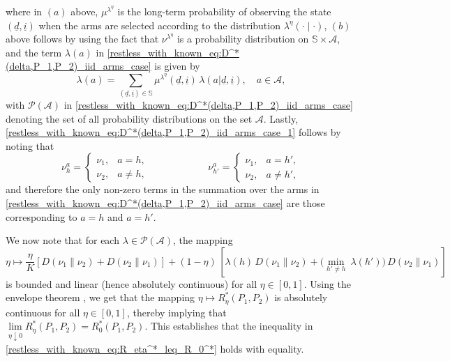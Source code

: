 { \color{black} where in $(a)$ above, $\mu^{\lambda^\eta}$ is the long-term probability of observing the state $(\underline{d},\underline{i})$ when the arms are selected according to the distribution $\lambda^\eta(\cdot\mid \cdot)$, $(b)$ above follows by using the fact that $\nu^{\lambda^\eta}$ is a probability distribution on $\mathbb{S}\times \mathcal{A}$, and the term $\lambda(a)$ in \eqref{restless_with_known_eq:D^*(delta,P_1,P_2)_iid_arms_case} is given by $$\lambda(a)=\sum\limits_{(\underline{d},\underline{i})\in\mathbb{S}}\mu^{\lambda^\eta}(\underline{d},\underline{i})\,\lambda(a|\underline{d},\underline{i}),\quad a\in\mathcal{A},$$ with $\mathcal{P}(\mathcal{A})$ in \eqref{restless_with_known_eq:D^*(delta,P_1,P_2)_iid_arms_case} denoting the set of all probability distributions on the set $\mathcal{A}$. Lastly, \eqref{restless_with_known_eq:D^*(delta,P_1,P_2)_iid_arms_case_1} follows by noting that
\begin{equation}
\nu_h^a=\begin{cases}
\nu_1, &a=h,\\
\nu_2, &a\neq h,
\end{cases} \qquad \qquad \qquad \nu_{h'}^a=\begin{cases}
\nu_1, &a=h',\\
\nu_2, &a\neq h',
\end{cases}
\end{equation}
and therefore the only non-zero terms in the summation over the arms in \eqref{restless_with_known_eq:D^*(delta,P_1,P_2)_iid_arms_case} are those corresponding to $a=h$ and $a=h'$.}

{\color{black} We now note that for each $\lambda \in \mathcal{P}(\mathcal{A})$, the mapping 
$$  
\eta \longmapsto \frac{\eta}{K}\left[D(\nu_1\|\nu_2)+D(\nu_2\|\nu_1)\right]+(1-\eta)\,\left[\lambda(h)\,D(\nu_1\|\nu_2)+\bigg(\min\limits_{h'\neq h} ~\lambda(h')\bigg)\,D(\nu_2\|\nu_1)\right]
$$
is bounded and linear (hence absolutely continuous) for all $\eta\in[0,1]$. Using the envelope theorem \cite[Theorem 2]{milgrom2002envelope}, we get that the mapping $\eta \mapsto R_\eta^*(P_1, P_2)$ is absolutely continuous for all $\eta\in [0,1]$, thereby implying that $\lim\limits_{\eta \downarrow 0} R_\eta^*(P_1,P_2)=R_0^*(P_1, P_2)$. This establishes that the inequality in \eqref{restless_with_known_eq:R_eta^*_leq_R_0^*} holds with equality.}

